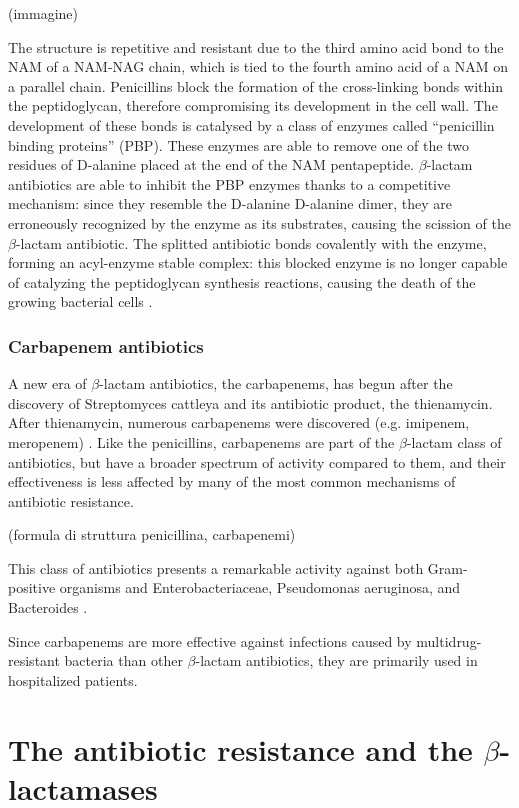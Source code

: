 \documentclass[11pt]{report}
\begin{document}
(immagine)

The structure is repetitive and resistant due to the third amino acid bond to the NAM of a NAM-NAG chain, which is tied to the fourth amino acid of a NAM on a parallel chain.
Penicillins block the formation of the cross-linking bonds within the peptidoglycan, therefore compromising its development in the cell wall. The development of these bonds is catalysed by a class of enzymes called “penicillin binding proteins” (PBP). These enzymes are able to remove one of the two residues of D-alanine placed at the end of the NAM pentapeptide.
$\beta$-lactam antibiotics are able to inhibit the PBP enzymes thanks to a competitive mechanism: since they resemble the D-alanine D-alanine dimer, they are erroneously recognized by the enzyme as its substrates, causing the scission of the $\beta$-lactam antibiotic. The splitted antibiotic bonds covalently with the enzyme, forming an acyl-enzyme stable complex: this blocked enzyme is no longer capable of catalyzing the peptidoglycan synthesis reactions, causing the death of the growing bacterial cells \cite{KONG2010}.


\subsection{Carbapenem antibiotics}
A new era of $\beta$-lactam antibiotics, the carbapenems, has begun after the discovery of Streptomyces cattleya and its antibiotic product, the thienamycin.
After thienamycin, numerous carbapenems were discovered (e.g. imipenem, meropenem) \cite{Birnbaum1985}.
Like the penicillins, carbapenems are part of the $\beta$-lactam class of antibiotics, but have a broader spectrum of activity compared to them, and their effectiveness is less affected by many of the most common mechanisms of antibiotic resistance.

(formula di struttura penicillina, carbapenemi)

This class of antibiotics presents a remarkable activity against both Gram-positive organisms and Enterobacteriaceae, Pseudomonas aeruginosa, and Bacteroides \cite{Neu1985}.

Since carbapenems are more effective against infections caused by multidrug-resistant bacteria than other $\beta$-lactam antibiotics, they are primarily used in hospitalized patients.

\chapter{The antibiotic resistance and the $\beta$-lactamases}
\end{document}
